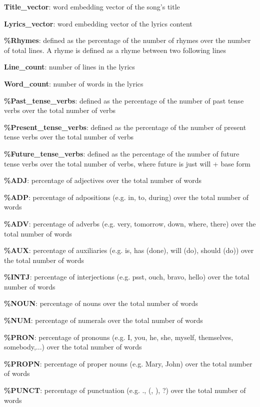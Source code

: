 \begin{description}
\item \textbf{Title\_vector}: word embedding vector of the song's title
\item \textbf{Lyrics\_vector}: word embedding vector of the lyrics content
\item \textbf{\%Rhymes}: defined as the percentage of the number of rhymes over the number of total lines. A rhyme is defined as a rhyme between two following lines
\item \textbf{Line\_count}: number of lines in the lyrics
\item \textbf{Word\_count}: number of words in the lyrics
\item \textbf{\%Past\_tense\_verbs}: defined as the percentage of the number of past tense verbs over the total number of verbs
\item \textbf{\%Present\_tense\_verbs}: defined as the percentage of the number of present tense verbs over the total number of verbs
\item \textbf{\%Future\_tense\_verbs}: defined as the percentage of the number of future tense verbs over the total number of verbs, where future is just will + base form
\item \textbf{\%ADJ}: percentage of adjectives over the total number of words
\item \textbf{\%ADP}: percentage of adpositions (e.g. in, to, during) over the total number of words
\item \textbf{\%ADV}: percentage of adverbs (e.g. very, tomorrow, down, where, there) over the total number of words
\item \textbf{\%AUX}: percentage of auxiliaries (e.g. is, has (done), will (do), should (do)) over the total number of words
\item \textbf{\%INTJ}: percentage of interjections (e.g. psst, ouch, bravo, hello) over the total number of words
\item \textbf{\%NOUN}: percentage of nouns over the total number of words
\item \textbf{\%NUM}: percentage of numerals over the total number of words
\item \textbf{\%PRON}: percentage of pronouns (e.g. I, you, he, she, myself, themselves, somebody,...) over the total number of words
\item \textbf{\%PROPN}: percentage of proper nouns (e.g. Mary, John) over the total number of words
\item \textbf{\%PUNCT}: percentage of punctuation (e.g. ., (, ), ?) over the total number of words

\end{description}
